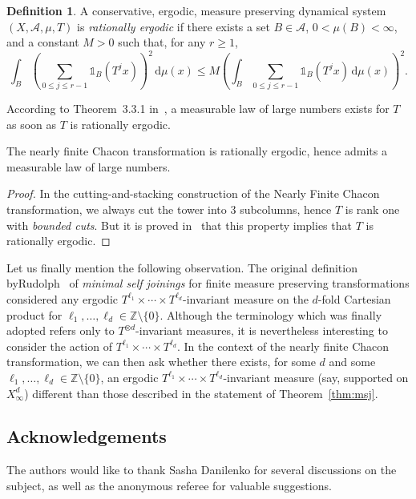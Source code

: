 \documentclass[10pt]{amsart}
\theoremstyle{definition}\newtheorem{defi}[theo]{Definition}\newtheorem{rema}[theo]{Remark}\newtheorem{exam}[theo]{Example}\newtheorem{exem}[theo]{Example}\newtheorem{nota}[theo]{Notation}
\newcommand{\ind}[1]{\mathds{1}_{#1}}
\newcommand{\ZZ}{\mathbb{Z}}
\newcommand{\A}{\mathscr{A}}
\newcommand*{\dd}{\mathrm{d}}
\begin{document}
\begin{defi}
A conservative, ergodic, measure preserving dynamical system $(X,\A,\mu,T)$ is \emph{rationally ergodic} if there exists a set $B\in\A$, $0<\mu(B)<\infty$, and a constant $M>0$ such that, for any $r\ge1$,
\[
\int_B \left(\sum_{0\le j\le r-1}\ind{B}(T^jx)\right)^2 \, \dd\mu(x) \le M \left(\int_B \sum_{0\le j\le r-1}\ind{B}(T^jx) \, \dd\mu(x)\right)^2.
\]
\end{defi}

According to Theorem~3.3.1 in~\cite{Aaronson}, a measurable law of large numbers exists for $T$ as soon as $T$ is rationally ergodic.


\begin{prop}\label{prop:rational_ergodicity}
The nearly finite Chacon transformation is rationally ergodic, hence admits a measurable law of large numbers.
\end{prop}

\begin{proof}
In the cutting-and-stacking construction of the Nearly Finite Chacon transformation, we always cut the tower into 3 subcolumns, hence $T$ is rank one with \emph{bounded cuts}. But it is proved in~\cite[Theorem~2.3]{BSSSW2015} that this property implies that $T$ is rationally ergodic.
\end{proof}

Let us finally mention the following observation. The original definition by\linebreak Rudolph~\cite{Rudolph79} of \emph{minimal self joinings} for finite measure preserving transformations considered any ergodic $T^{\ell_1}\times\cdots \times T^{\ell_d}$-invariant measure on the $d$-fold Cartesian product for $\ell_1,\ldots,\ell_d\in\ZZ\setminus\{0\}$. Although the terminology which was finally adopted refers only to $T^{\otimes d}$-invariant measures, it is nevertheless interesting to consider the action of $T^{\ell_1}\times\cdots \times T^{\ell_d}$. In the context of the nearly finite Chacon transformation, we can then ask whether there exists, for some $d$ and some $\ell_1,\ldots,\ell_d\in\ZZ\setminus\{0\}$, an ergodic $T^{\ell_1}\times\cdots \times T^{\ell_d}$-invariant measure (say, supported on $X_\infty^d$) different than those described in the statement of Theorem~\ref{thm:msj}.


\subsection*{Acknowledgements} The authors would like to thank Sasha Danilenko for several discussions on the subject, as well as the anonymous referee for valuable suggestions.
\end{document}
